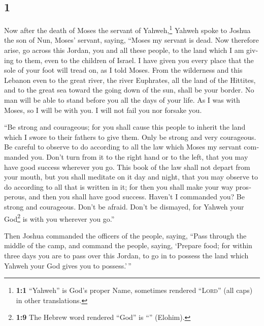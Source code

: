 \begin{paracol}{2}
\begin{otherlanguage}{english}
\hypertarget{section-1}{%
\section{1}\label{section-1}}

 Now after the death of Moses the servant of
Yahweh,\footnote{\textbf{1:1} ``Yahweh'' is God's proper Name, sometimes
  rendered ``\textsc{Lord}'' (all caps) in other translations.} Yahweh
spoke to Joshua the son of Nun, Moses' servant, saying, 
``Moses my servant is dead. Now therefore arise, go across this Jordan,
you and all these people, to the land which I am giving to them, even to
the children of Israel.  I have given you every place that
the sole of your foot will tread on, as I told Moses. 
From the wilderness and this Lebanon even to the great river, the river
Euphrates, all the land of the Hittites, and to the great sea toward the
going down of the sun, shall be your border.  No man will
be able to stand before you all the days of your life. As I was with
Moses, so I will be with you. I will not fail you nor forsake you.

 ``Be strong and courageous; for you shall cause this
people to inherit the land which I swore to their fathers to give them.
 Only be strong and very courageous. Be careful to observe
to do according to all the law which Moses my servant commanded you.
Don't turn from it to the right hand or to the left, that you may have
good success wherever you go.  This book of the law shall
not depart from your mouth, but you shall meditate on it day and night,
that you may observe to do according to all that is written in it; for
then you shall make your way prosperous, and then you shall have good
success.  Haven't I commanded you? Be strong and
courageous. Don't be afraid. Don't be dismayed, for Yahweh your
God\footnote{\textbf{1:9} The Hebrew word rendered ``God'' is
  ``'' (Elohim).} is with you wherever you go.''

 Then Joshua commanded the officers of the people,
saying,  ``Pass through the middle of the camp, and
command the people, saying, `Prepare food; for within three days you are
to pass over this Jordan, to go in to possess the land which Yahweh your
God gives you to possess.'\,''


\end{otherlanguage}
\end{paracol}
